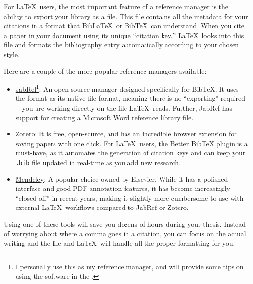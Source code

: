 			For \LaTeX\ users, the most important feature of a reference manager is the ability to export your library as a  file. 
			This file contains all the metadata for your citations in a format that Bib\LaTeX\ or Bib\TeX\ can understand. 
			When you cite a paper in your document using its unique \enquote{citation key,} \LaTeX\ looks into this file and formats the bibliography entry automatically according to your chosen style.
			
			Here are a couple of the more popular reference managers available:
			\begin{itemize}
				\item \href{https://www.jabref.org/}{JabRef\footnote{I personally use this as my reference manager, and will provide some tips on using the software in the .}}: An open-source manager designed specifically for Bib\TeX. 
					It uses the  format as its native file format, meaning there is no \enquote{exporting} required—you are working directly on the file \LaTeX\ reads.
					Further, JabRef has support for creating a Microsoft Word reference library file.
				\item \href{https://www.zotero.org/}{Zotero}: It is free, open-source, and has an incredible browser extension for saving papers with one click. 
					For \LaTeX\ users, the \href{https://retorque.re/zotero-better-bibtex/}{Better BibTeX} plugin is a must-have, as it automates the generation of citation keys and can keep your \texttt{.bib} file updated in real-time as you add new research.
				\item \href{https://www.mendeley.com/}{Mendeley}: A popular choice owned by Elsevier. 
					While it has a polished interface and good PDF annotation features, it has become increasingly \enquote{closed off} in recent years, making it slightly more cumbersome to use with external \LaTeX\ workflows compared to JabRef or Zotero.
			\end{itemize}

			Using one of these tools will save you dozens of hours during your thesis. 
			Instead of worrying about where a comma goes in a citation, you can focus on the actual writing and the  file and \LaTeX\ will handle all the proper formatting for you.

